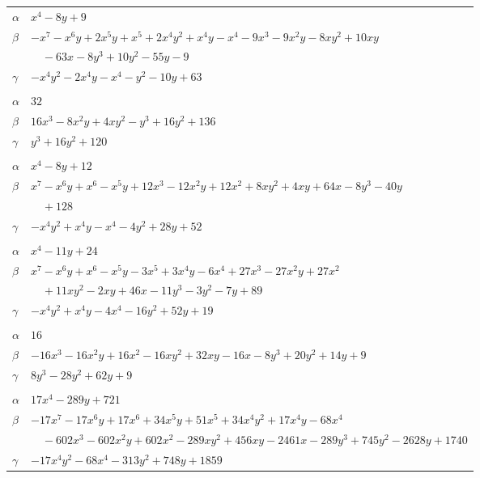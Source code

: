 \documentclass[11pt]{article}
\begin{document}
\begin{longtable}{@{}ll@{}}
$\alpha$ & $x^{4}-8y+9$\\
$\beta$ & $-x^{7}-x^{6}y+2x^{5}y+x^{5}+2x^{4}y^{2}+x^{4}y-x^{4}-9x^{3}-9x^{2}y-8xy^{2}+10xy$\\
 & $\quad -63x-8y^{3}+10y^{2}-55y-9$\\
$\gamma$ & $-x^{4}y^{2}-2x^{4}y-x^{4}-y^{2}-10y+63$\\
\addlinespace[3pt]
\multicolumn{2}{@{}l}{$\{i,j\}=\{5,8\}$, $k_{ij}=2^{5}$}\\
$\alpha$ & $32$\\
$\beta$ & $16x^{3}-8x^{2}y+4xy^{2}-y^{3}+16y^{2}+136$\\
$\gamma$ & $y^{3}+16y^{2}+120$\\
\addlinespace[3pt]
\multicolumn{2}{@{}l}{$\{i,j\}=\{6,18\}$, $k_{ij}=2^{6}\cdot 3$}\\
$\alpha$ & $x^{4}-8y+12$\\
$\beta$ & $x^{7}-x^{6}y+x^{6}-x^{5}y+12x^{3}-12x^{2}y+12x^{2}+8xy^{2}+4xy+64x-8y^{3}-40y$\\
 & $\quad +128$\\
$\gamma$ & $-x^{4}y^{2}+x^{4}y-x^{4}-4y^{2}+28y+52$\\
\addlinespace[3pt]
\multicolumn{2}{@{}l}{$\{i,j\}=\{6,25\}$, $k_{ij}=3\cdot 5^{2}$}\\
$\alpha$ & $x^{4}-11y+24$\\
$\beta$ & $x^{7}-x^{6}y+x^{6}-x^{5}y-3x^{5}+3x^{4}y-6x^{4}+27x^{3}-27x^{2}y+27x^{2}$\\
 & $\quad +11xy^{2}-2xy+46x-11y^{3}-3y^{2}-7y+89$\\
$\gamma$ & $-x^{4}y^{2}+x^{4}y-4x^{4}-16y^{2}+52y+19$\\
\addlinespace[3pt]
\multicolumn{2}{@{}l}{$\{i,j\}=\{7,10\}$, $k_{ij}=7$}\\
$\alpha$ & $16$\\
$\beta$ & $-16x^{3}-16x^{2}y+16x^{2}-16xy^{2}+32xy-16x-8y^{3}+20y^{2}+14y+9$\\
$\gamma$ & $8y^{3}-28y^{2}+62y+9$\\
\addlinespace[3pt]
\multicolumn{2}{@{}l}{$\{i,j\}=\{7,13\}$, $k_{ij}=2^{5}\cdot 3^{3}\cdot 5$}\\
$\alpha$ & $17x^{4}-289y+721$\\
$\beta$ & $-17x^{7}-17x^{6}y+17x^{6}+34x^{5}y+51x^{5}+34x^{4}y^{2}+17x^{4}y-68x^{4}$\\
 & $\quad -602x^{3}-602x^{2}y+602x^{2}-289xy^{2}+456xy-2461x-289y^{3}+745y^{2}-2628y+1740$\\
$\gamma$ & $-17x^{4}y^{2}-68x^{4}-313y^{2}+748y+1859$\\

\end{longtable}
\end{document}
